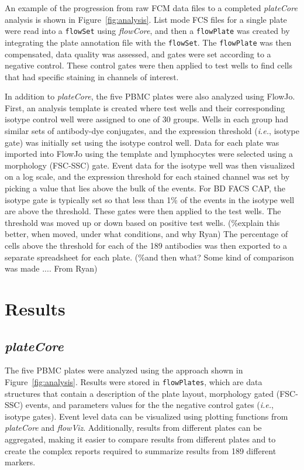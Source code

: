 \documentclass[12pt]{article}
\newcommand{\Robject}[1]{{\texttt{#1}}}
\newcommand{\Rpackage}[1]{{\textit{#1}}}
\begin{document}
An example of the progression from raw FCM data files to a completed \Rpackage{plateCore} analysis is shown in Figure~\ref{fig:analysis}.
List mode FCS files for a single plate were read into a \Robject{flowSet} using \Rpackage{flowCore}, and then a \Robject{flowPlate} was created by integrating
the plate annotation file with the \Robject{flowSet}. The \Robject{flowPlate} was then compensated, data quality was assessed, and gates
were set according to a negative control. These control gates were then applied to test wells to find cells that had specific staining
in channels of interest. 

In addition to \Rpackage{plateCore}, the five PBMC plates were also analyzed using FlowJo. %
First, an analysis template is created
where test wells and their corresponding isotype control well were assigned to one of 30 groups. Wells in each
group had similar sets of antibody-dye conjugates, and the expression threshold (\emph{i.e.}, isotype gate)
was initially set using the isotype control well. Data for each plate was imported into FlowJo using the template and
lymphocytes were selected using a morphology (FSC-SSC) gate. Event data for the isotype well was then
visualized on a log scale, and the expression threshold for each stained channel was set by picking a
value that lies above the bulk of the events. For BD FACS CAP, the isotype gate is typically %
set so that less than
1\% of the events in the isotype well are above the threshold. These gates were then applied to the test
wells. 
The threshold was moved up or down based on positive test wells. (\%explain this
better, when moved, under what conditions, and why  Ryan)
The percentage of cells above the threshold for each of the 189 antibodies was then exported to a separate spreadsheet for 
each plate. (\%and then what? Some kind of comparison was made .... From Ryan)

\section*{Results}

\subsection*{\Rpackage{plateCore}}
The five PBMC plates were analyzed using the approach shown in Figure~\ref{fig:analysis}.  Results
were stored in \Robject{flowPlates}, which are data structures that contain a description of the
plate layout, morphology gated (FSC-SSC) events, and parameters values for the 
the negative control gates (\emph{i.e.}, isotype gates). Event level data can be 
visualized using plotting functions from \Rpackage{plateCore} and \Rpackage{flowViz}. 
Additionally, results from different plates can be aggregated, making it easier to compare
results from different plates and to create the complex reports required to summarize results from 
189 different markers.
\end{document}
